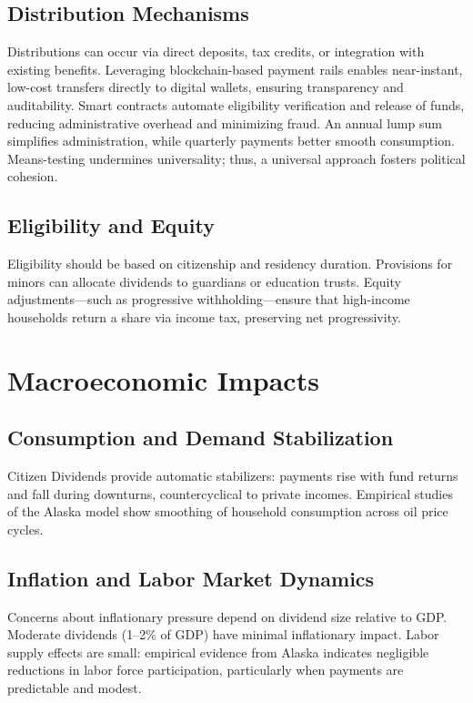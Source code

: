 \documentclass[11pt]{article}
\begin{document}
\subsection{Distribution Mechanisms}
Distributions can occur via direct deposits, tax credits, or integration with existing benefits. Leveraging blockchain-based payment rails enables near-instant, low-cost transfers directly to digital wallets, ensuring transparency and auditability. Smart contracts automate eligibility verification and release of funds, reducing administrative overhead and minimizing fraud. An annual lump sum simplifies administration, while quarterly payments better smooth consumption. Means-testing undermines universality; thus, a universal approach fosters political cohesion.

\subsection{Eligibility and Equity}
Eligibility should be based on citizenship and residency duration. Provisions for minors can allocate dividends to guardians or education trusts. Equity adjustments—such as progressive withholding—ensure that high-income households return a share via income tax, preserving net progressivity.

\section{Macroeconomic Impacts}
\subsection{Consumption and Demand Stabilization}
Citizen Dividends provide automatic stabilizers: payments rise with fund returns and fall during downturns, countercyclical to private incomes. Empirical studies of the Alaska model show smoothing of household consumption across oil price cycles.

\subsection{Inflation and Labor Market Dynamics}
Concerns about inflationary pressure depend on dividend size relative to GDP. Moderate dividends (1–2\% of GDP) have minimal inflationary impact. Labor supply effects are small: empirical evidence from Alaska indicates negligible reductions in labor force participation, particularly when payments are predictable and modest.
\end{document}
